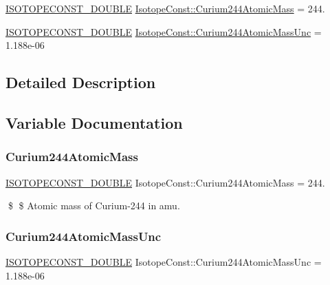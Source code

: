 \begin{DoxyCompactItemize}
\item 
\mbox{\hyperlink{group___isotope_const-_macros_ga8f45a7272ce02c0b4c65c44636ed719a}{I\+S\+O\+T\+O\+P\+E\+C\+O\+N\+S\+T\+\_\+\+D\+O\+U\+B\+LE}} \mbox{\hyperlink{group___isotope_const-_curium-_cm244_ga9554d647226e49f38632fa47d236f8dc}{Isotope\+Const\+::\+Curium244\+Atomic\+Mass}} = 244.
\item 
\mbox{\hyperlink{group___isotope_const-_macros_ga8f45a7272ce02c0b4c65c44636ed719a}{I\+S\+O\+T\+O\+P\+E\+C\+O\+N\+S\+T\+\_\+\+D\+O\+U\+B\+LE}} \mbox{\hyperlink{group___isotope_const-_curium-_cm244_gadb2ce60f2ed93276bf1f0b6aaa773a5d}{Isotope\+Const\+::\+Curium244\+Atomic\+Mass\+Unc}} = 1.\+188e-\/06
\end{DoxyCompactItemize}


\subsection{Detailed Description}


\subsection{Variable Documentation}
\mbox{\label{group___isotope_const-_curium-_cm244_ga9554d647226e49f38632fa47d236f8dc}} 
\subsubsection{\texorpdfstring{Curium244\+Atomic\+Mass}{Curium244AtomicMass}}
{\footnotesize\ttfamily \mbox{\hyperlink{group___isotope_const-_macros_ga8f45a7272ce02c0b4c65c44636ed719a}{I\+S\+O\+T\+O\+P\+E\+C\+O\+N\+S\+T\+\_\+\+D\+O\+U\+B\+LE}} Isotope\+Const\+::\+Curium244\+Atomic\+Mass = 244.}

\$ \$ Atomic mass of Curium-\/244 in amu. \mbox{\label{group___isotope_const-_curium-_cm244_gadb2ce60f2ed93276bf1f0b6aaa773a5d}} 
\subsubsection{\texorpdfstring{Curium244\+Atomic\+Mass\+Unc}{Curium244AtomicMassUnc}}
{\footnotesize\ttfamily \mbox{\hyperlink{group___isotope_const-_macros_ga8f45a7272ce02c0b4c65c44636ed719a}{I\+S\+O\+T\+O\+P\+E\+C\+O\+N\+S\+T\+\_\+\+D\+O\+U\+B\+LE}} Isotope\+Const\+::\+Curium244\+Atomic\+Mass\+Unc = 1.\+188e-\/06}

